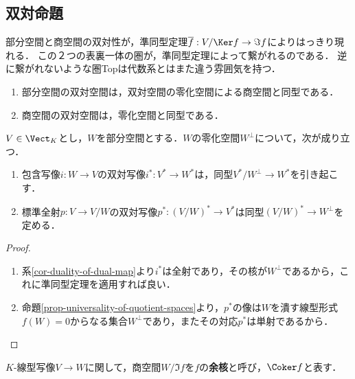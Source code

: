 \documentclass[uplatex, dvipdfmx]{jsreport}
\begin{document}
\subsection{双対命題}

\begin{tcolorbox}[colframe=ForestGreen, colback=ForestGreen!10!white, breakable]
    部分空間と商空間の双対性が，準同型定理$\overline{f}:V/\Ker f\to\Im f$によりはっきり現れる．
    この２つの表裏一体の圏が，準同型定理によって繋がれるのである．
    逆に繋がれないような圏Topは代数系とはまた違う雰囲気を持つ．
    \begin{enumerate}
        \item 部分空間の双対空間は，双対空間の零化空間による商空間と同型である．
        \item 商空間の双対空間は，零化空間と同型である．
    \end{enumerate}
\end{tcolorbox}

\begin{proposition}\label{prop-fundamental-theorem-of-dual-maps}
    $V\in\Vect_K$とし，$W$を部分空間とする．$W$の零化空間$W^\bot$について，次が成り立つ．
    \begin{enumerate}
        \item 包含写像$i:W\to V$の双対写像$i^*:V^*\to W^*$は，同型$V^*/W^\bot\to W^*$を引き起こす．
        \item 標準全射$p:V\to V/W$の双対写像$p^*:(V/W)^*\to V^*$は同型$(V/W)^*\to W^\bot$を定める．
    \end{enumerate}
\end{proposition}
\begin{proof}\mbox{}
    \begin{enumerate}
        \item 系\ref{cor-duality-of-dual-map}より$i^*$は全射であり，その核が$W^\bot$であるから，これに準同型定理を適用すれば良い．
        \item 命題\ref{prop-universality-of-quotient-spaces}より，$p^*$の像は$W$を潰す線型形式$f(W)=0$からなる集合$W^\bot$であり，またその対応$p^*$は単射であるから．
    \end{enumerate}
\end{proof}

\begin{definition}[cokernel]
    $K$-線型写像$V\to W$に関して，商空間$W/\Im f$を$f$の\textbf{余核}と呼び，$\Coker f$と表す．
\end{definition}
\end{document}
